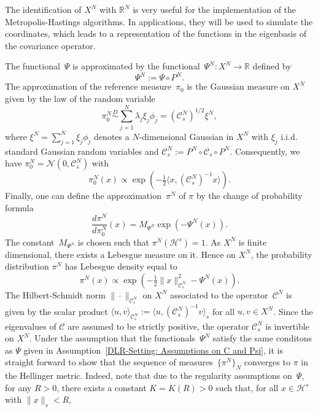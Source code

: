 \begin{rem}
 The identification of $X^N$ with $\mathbb{R}^N$ is very useful for the implementation of the Metropolis-Hastings algorithms. In applications, they will be used to simulate the coordinates, which leads to a representation of the functions in the eigenbasis of the covariance operator.
\end{rem}

The functional~$\Psi$ is approximated by the functional~$\Psi^N : X^N \to \mathbb{R}$ defined by
\begin{equation}
\label{DLR-Setting: Definition Psi^N}
 \Psi^N := \Psi \circ P^N.
\end{equation}
The approximation of the reference measure~$\pi_0$ is the Gaussian measure on $X^N$ given by the law of the random variable
\begin{equation*}
 \pi^N_0 \stackrel{D}{\sim} \sum_{j=1}^{N} \lambda_j \xi_j \phi_j = (\mathcal{C}^N_s)^{1/2} \xi^N, 
\end{equation*}
where $\xi^N = \sum_{j=1}^{N} \xi_j \phi_j$ denotes a $N$-dimensional Gaussian in $X^N$ with $\xi_j$ i.i.d.\,standard Gaussian random variables and  $\mathcal{C}_s^N :=P^N \circ \mathcal{C}_s \circ P^N $. Consequently, we have $\pi_0^N = \mathcal{N}(0, \mathcal{C}_s^N)$ with
\begin{equation*}
 \pi_0^N (x) \varpropto \exp (- \tfrac{1}{2} \langle x, (\mathcal{C}^N_s)^{-1} x \rangle).
\end{equation*}
Finally, one can define the approximation~$\pi^N$ of $\pi$ by the change of probability formula
\begin{equation}
\label{DLR-Setting: Definition of pi^N}
 \frac{d \pi^N}{d \pi_0^N} (x) = M_{\Psi^N} \exp (- \Psi^N (x)).
\end{equation}
The constant~$M_{\Psi^N}$ is chosen such that $\pi^N (\mathcal{H}^s) =1$. As $X^N$ is finite dimensional, there exists a Lebesgue measure on it. Hence on $X^{N}$, the probability distribution $\pi^{N}$ has Lebesgue density equal to
\begin{equation}
\label{DLR-Setting: Definition finite dim target measure pi^N}
 \pi^N (x) \varpropto \exp (-\tfrac{1}{2} \| x \|^2_{\mathcal{C}_s^N} - \Psi^N (x)).
\end{equation}
The Hilbert-Schmidt norm  $ \| \cdot \|_{\mathcal{C}_s^{N}} $ on $X^{N}$ associated to the operator~$\mathcal{C}^N$ is given by the scalar product $ \langle u, v \rangle_{\mathcal{C}_s^{N}} := \langle u, ( \mathcal{C}_s^{N} )^{-1} v \rangle_s $ for all $ u,v \in X^{N} $. Since the eigenvalues of $ \mathcal{C} $ are assumed to be strictly positive, the operator $ \mathcal{C}_s^{N} $ is invertible on $X^{N}$. Under the assumption that the functionals~$\Psi^N$ satisfy the same conditons as $\Psi$ given in Assumption~\ref{DLR-Setting: Assumptions on C and Psi}, it is straight forward to show that the sequence of measures~$\{ \pi^N \}_N$ converges to $\pi$ in the Hellinger metric. Indeed, note that due to the regularity assumptions on~$\Psi$, for any $R>0$, there exists a constant $K=K(R)>0$ such that, for all $x\in \mathcal{H}^s$ with $\|x\|_s < R$,
